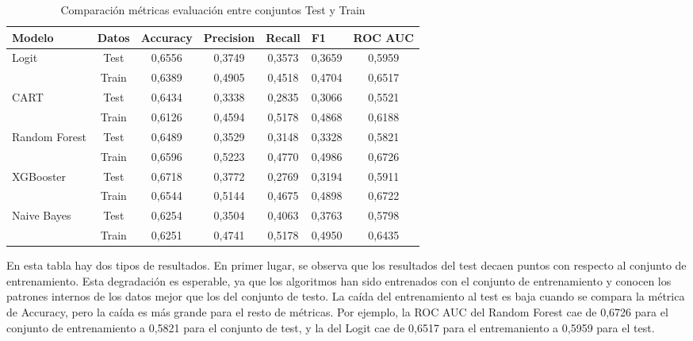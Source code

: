 \begin{table}[ht]
\centering
\begin{tabular}{lcccccc}
\hline
\textbf{Modelo} & \multicolumn{1}{l}{\textbf{Datos}} & \multicolumn{1}{l}{\textbf{Accuracy}} & \multicolumn{1}{l}{\textbf{Precision}} & \multicolumn{1}{l}{\textbf{Recall}} & \multicolumn{1}{l}{\textbf{F1}} & \multicolumn{1}{l}{\textbf{ROC AUC}} \\ \hline
\multirow{2}{*}{Logit} & Test & 0,6556 & 0,3749 & 0,3573 & 0,3659 & 0,5959 \\
 & Train & 0,6389 & 0,4905 & 0,4518 & 0,4704 & 0,6517 \\ \hline
\multirow{2}{*}{CART} & Test & 0,6434 & 0,3338 & 0,2835 & 0,3066 & 0,5521 \\
 & Train & 0,6126 & 0,4594 & 0,5178 & 0,4868 & 0,6188 \\ \hline
\multirow{2}{*}{Random Forest} & Test & 0,6489 & 0,3529 & 0,3148 & 0,3328 & 0,5821 \\
 & Train & 0,6596 & 0,5223 & 0,4770 & 0,4986 & 0,6726 \\ \hline
\multirow{2}{*}{XGBooster} & Test & 0,6718 & 0,3772 & 0,2769 & 0,3194 & 0,5911 \\
 & Train & 0,6544 & 0,5144 & 0,4675 & 0,4898 & 0,6722 \\ \hline
\multirow{2}{*}{Naive Bayes} & Test & 0,6254 & 0,3504 & 0,4063 & 0,3763 & 0,5798 \\
 & Train & 0,6251 & 0,4741 & 0,5178 & 0,4950 & 0,6435 \\ \hline
\end{tabular}
\caption{Comparación métricas evaluación entre conjuntos Test y Train}
\label{table:train}
\end{table}

En esta tabla hay dos tipos de resultados. En primer lugar, se observa que los resultados del test decaen puntos con respecto al conjunto de entrenamiento. Esta degradación es esperable, ya que los algoritmos han sido entrenados con el conjunto de entrenamiento y conocen los patrones internos de los datos mejor que los del conjunto de testo. La caída del entrenamiento al test es baja cuando se compara la métrica de Accuracy, pero la caída es más grande para el resto de métricas. Por ejemplo, la ROC AUC del Random Forest cae de 0,6726 para el conjunto de entrenamiento a 0,5821 para el conjunto de test, y la del Logit cae de 0,6517 para el entremaniento a 0,5959 para el test.

